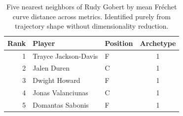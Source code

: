 \begin{table}[htbp]
  \centering\small
  \begin{tabular}{rllc}
    \toprule
    Rank & Player & Position & Archetype \\
    \midrule
    1 & Trayce Jackson-Davis & F & 1 \\
    2 & Jalen Duren & C & 1 \\
    3 & Dwight Howard & F & 1 \\
    4 & Jonas Valanciunas & C & 1 \\
    5 & Domantas Sabonis & F & 1 \\
    \bottomrule
  \end{tabular}
  \caption{Five nearest neighbors of Rudy Gobert by mean Fr\'{e}chet curve distance across metrics. Identified purely from trajectory shape without dimensionality reduction.}
  \label{tab:Rudy_Gobert_frechet_curve_neighbors}
\end{table}

